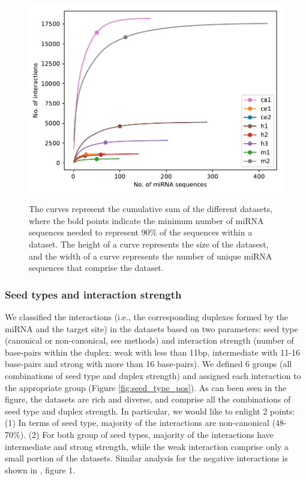 \documentclass{bmcart}
\begin{document}
\begin{figure}[h!]
  \caption{ The curves represent the cumulative sum of the different datasets, where the bold points indicate the minimum number of miRNA sequences needed to represent 90\% of the sequences within a dataset. The height of a curve represents the size of the datasest, and the width of a curve represents the number of unique miRNA sequences that comprise the dataset.}
      \includegraphics[width = 1\textwidth]{Results/mirna_dist.pdf}
      \label{fig:datasetplot}
      \end{figure}


\subsubsection*{Seed types and interaction strength}
We classified the interactions (i.e., the corresponding duplexes formed by the miRNA and the target site) in the datasets based on two parameters: seed type (canonical or non-canonical, see methods) and interaction strength (number of base-pairs within the duplex: weak with less than 11bp, intermediate with 11-16 base-pairs and strong with more than 16 base-pairs). We defined 6 groups (all combinations of seed type and duplex strength) and assigned each interaction to the appropriate group (Figure \ref{fig:seed_type_pos}). As can been seen in the figure, the datasets are rich and diverse, and comprise all the combinations of seed type and duplex strength. In particular, we would like to enlight 2 points: (1) In terms of seed type, majority of the interactions are non-canonical (48-70\%). (2) For both group of seed types,  majority of the interactions have intermediate and strong strength, while the weak interaction comprise only a small portion of the datasets. 
Similar analysis for the negative interactions is shown in , figure 1.
\end{document}
